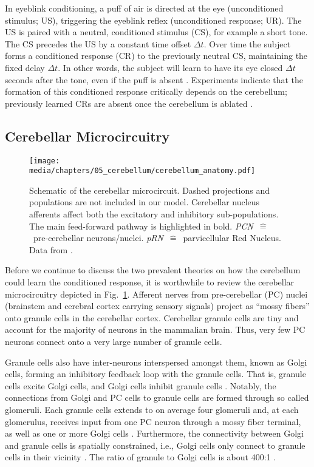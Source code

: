 In eyeblink conditioning, a puff of air is directed at the eye (unconditioned stimulus; US), triggering the eyeblink reflex (unconditioned response; UR). The US is paired with a neutral, conditioned stimulus (CS), for example a short tone. The CS precedes the US by a constant time offset $\Delta t$. Over time the subject forms a conditioned response (CR) to the previously neutral CS, maintaining the fixed delay $\Delta t$. In other words, the subject will learn to have its eye closed $\Delta t$ seconds after the tone, even if the puff is absent \citep[cf.][]{heiney2014cerebellardependent}. Experiments indicate that the formation of this conditioned response critically depends on the cerebellum; previously learned CRs are absent once the cerebellum is ablated \citep{mccormick1981engram}.

\subsection{Cerebellar Microcircuitry}

\begin{figure}[t]
	\centering
	\texttt{[image: media/chapters/05\_cerebellum/cerebellum\_anatomy.pdf]}
	\caption[Schematic of the cerebellar microcircuit.]{Schematic of the cerebellar microcircuit. Dashed projections and populations are not included in our model. Cerebellar nucleus afferents affect both the excitatory and inhibitory sub-populations.  The main feed-forward pathway is highlighted in bold. \emph{PCN}~$\hat=$~pre-cerebellar neurons/nuclei. \emph{pRN}~$\hat=$~parvicellular Red Nucleus. Data from \citet{ito2010cerebellar,llinas2010olivocerebellar}.}
	\label{fig:cerebellum_anatomy}
\end{figure}

Before we continue to discuss the two prevalent theories on how the cerebellum could learn the conditioned response, it is worthwhile to review the cerebellar microcircuitry depicted in Fig.~\ref{fig:cerebellum_anatomy}.
Afferent nerves from pre-cerebellar (PC) nuclei (brainstem and cerebral cortex carrying sensory signals) project as \enquote{mossy fibers} onto granule cells in the cerebellar cortex.
Cerebellar granule cells are tiny and account for the majority of neurons in the mammalian brain. Thus, very few PC neurons connect onto a very large number of granule cells.

Granule cells also have inter-neurons interspersed amongst them, known as Golgi cells, forming an inhibitory feedback loop with the granule cells. That is, granule cells excite Golgi cells, and Golgi cells inhibit granule cells \citep{ito2010cerebellar}.
Notably, the connections from Golgi and PC cells to granule cells are formed through so called glomeruli. Each granule cells extends to on average four glomeruli and, at each glomerulus, receives input from one PC neuron through a mossy fiber terminal, as well as one or more Golgi cells \citep{palkovits1972quantitative,jakab1988quantitative,chadderton2004integration}.
Furthermore, the connectivity between Golgi and granule cells is spatially constrained, i.e., Golgi cells only connect to granule cells in their vicinity \citep{dangelo2013cerebellar}. The ratio of granule to Golgi cells is about 400:1 \citep{korbo1993total}.

